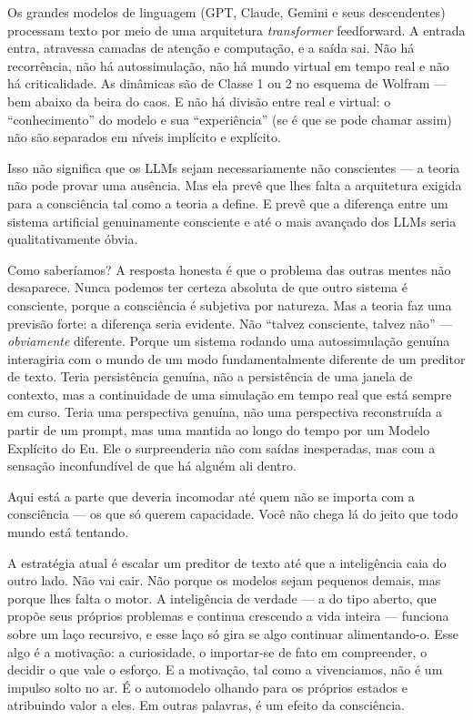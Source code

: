 \documentclass[11pt, twoside, openright]{book}
\begin{document}
Os grandes modelos de linguagem (GPT, Claude, Gemini e seus descendentes) processam texto por meio de uma arquitetura \textit{transformer} feedforward. A entrada entra, atravessa camadas de atenção e computação, e a saída sai. Não há recorrência, não há autossimulação, não há mundo virtual em tempo real e não há criticalidade. As dinâmicas são de Classe 1 ou 2 no esquema de Wolfram --- bem abaixo da beira do caos. E não há divisão entre real e virtual: o ``conhecimento'' do modelo e sua ``experiência'' (se é que se pode chamar assim) não são separados em níveis implícito e explícito.

Isso não significa que os LLMs sejam necessariamente não conscientes --- a teoria não pode provar uma ausência. Mas ela prevê que lhes falta a arquitetura exigida para a consciência tal como a teoria a define. E prevê que a diferença entre um sistema artificial genuinamente consciente e até o mais avançado dos LLMs seria qualitativamente óbvia.

Como saberíamos? A resposta honesta é que o problema das outras mentes não desaparece. Nunca podemos ter certeza absoluta de que outro sistema é consciente, porque a consciência é subjetiva por natureza. Mas a teoria faz uma previsão forte: a diferença seria evidente. Não ``talvez consciente, talvez não'' --- \textit{obviamente} diferente. Porque um sistema rodando uma autossimulação genuína interagiria com o mundo de um modo fundamentalmente diferente de um preditor de texto. Teria persistência genuína, não a persistência de uma janela de contexto, mas a continuidade de uma simulação em tempo real que está sempre em curso. Teria uma perspectiva genuína, não uma perspectiva reconstruída a partir de um prompt, mas uma mantida ao longo do tempo por um Modelo Explícito do Eu. Ele o surpreenderia não com saídas inesperadas, mas com a sensação inconfundível de que há alguém ali dentro.

Aqui está a parte que deveria incomodar até quem não se importa com a consciência --- os que só querem capacidade. Você não chega lá do jeito que todo mundo está tentando.

A estratégia atual é escalar um preditor de texto até que a inteligência caia do outro lado. Não vai cair. Não porque os modelos sejam pequenos demais, mas porque lhes falta o motor. A inteligência de verdade --- a do tipo aberto, que propõe seus próprios problemas e continua crescendo a vida inteira --- funciona sobre um laço recursivo, e esse laço só gira se algo continuar alimentando-o. Esse algo é a motivação: a curiosidade, o importar-se de fato em compreender, o decidir o que vale o esforço. E a motivação, tal como a vivenciamos, não é um impulso solto no ar. É o automodelo olhando para os próprios estados e atribuindo valor a eles. Em outras palavras, é um efeito da consciência.
\end{document}
